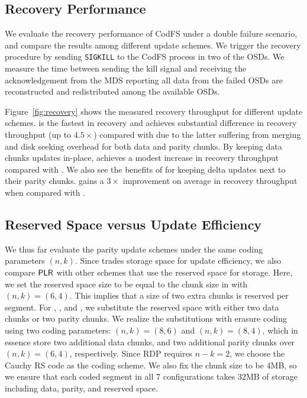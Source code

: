 \subsection{Recovery Performance}
\label{eval:recovery}


We evaluate the recovery performance of CodFS under a double failure scenario,
and compare the results among different update schemes. We trigger the recovery
procedure by sending \texttt{SIGKILL} to the CodFS process in two of the OSDs.
We measure the time between sending the kill signal and receiving the
acknowledgement from the MDS reporting all data from the failed OSDs
are reconstructed and redistributed among the available OSDs.

Figure~\ref{fig:recovery} shows the measured recovery throughput for different update
schemes. \FO is the fastest in recovery and achieves substantial difference in
recovery throughput (up to ${4.5\times}$) compared with \FL due to the
latter suffering from merging and disk seeking overhead for both data and
parity chunks. By keeping data chunks updates in-place, \PL achieves a modest
increase in recovery throughput compared with \FL.  We also see the benefits
of \PLR for keeping delta updates next to their parity chunks.  \PLR
gains a ${3\times}$ improvement on average in recovery throughput when
compared with \PL.

\subsection{Reserved Space versus Update Efficiency}
\label{eval:reserve_comparison}

We thus far evaluate the parity update schemes under the same coding
parameters $(n,k)$.  Since \PLR trades storage space for update efficiency, we
also compare $\textsf{PLR}$ with other schemes that use the reserved space for
storage.  Here, we set the reserved space size to be equal to the chunk size
in \PLR with $(n,k) = (6,4)$.  This implies that a size of two extra chunks is
reserved per segment.   For \FO, \FL, and \PL, we substitute the reserved
space with either two data chunks or two parity chunks.  We realize the
substitutions with erasure coding using two coding parameters: $(n,k) = (8,6)$
and $(n,k) = (8,4)$, which in essence store two additional data chunks, and
two additional parity chunks over $(n,k) = (6,4)$, respectively.  Since RDP
requires $n-k=2$, we choose the Cauchy RS code \cite{blomer95} as the coding
scheme.  We also fix the chunk size to be 4MB, so we ensure that each coded
segment in all 7 configurations takes 32MB of storage including data, parity,
and reserved space.  

